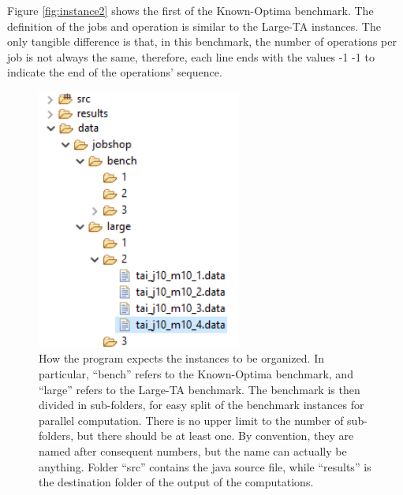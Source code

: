 \documentclass{article}
\begin{document}
Figure \ref{fig:instance2} shows the first of the Known-Optima benchmark. The definition of the jobs and operation is similar to the Large-TA instances. The only tangible difference is that, in this benchmark, the number of operations per job is not always the same, therefore, each line ends with the values -1 -1 to indicate the end of the operations' sequence. 

\begin{figure}
	\centering
		\includegraphics[width=0.6\textwidth]{folders.png}
	\caption{How the program expects the instances to be organized. In particular, ``bench'' refers to the Known-Optima benchmark, and ``large'' refers to the Large-TA benchmark. The benchmark is then divided in sub-folders, for easy split of the benchmark instances for parallel computation. There is no upper limit to the number of sub-folders, but there should be at least one. By convention, they are named after consequent numbers, but the name can actually be anything. Folder ``src'' contains the java source file, while ``results'' is the destination folder of the output of the computations.}
	\label{fig:folders}
\end{figure}
\end{document}
